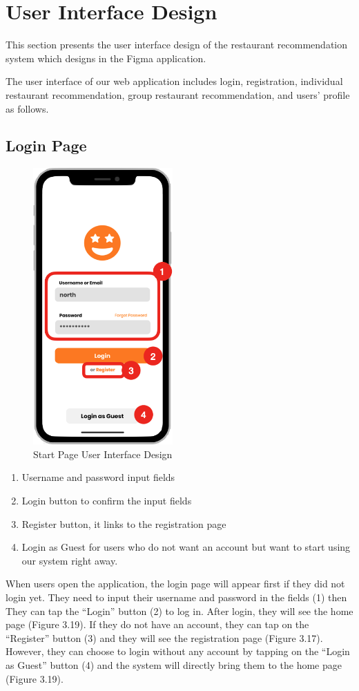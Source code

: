 \documentclass[12pt,oneside,openright,a4paper]{cpe-english-project}
\begin{document}
\section{User Interface Design}
This section presents the user interface design of the restaurant recommendation system which designs in the Figma application.

The user interface of our web application includes login, registration, individual restaurant recommendation, group restaurant recommendation, and users’ profile as follows.

\newpage
\subsection{Login Page}
\begin{figure}[H]\centering
\includegraphics[height=300pt]{./images/3ui_StartPageUserInterfaceDesign.png}
\caption{Start Page User Interface Design}\label{fig:3ui_StartPageUserInterfaceDesign}
\end{figure}
\begin{enumerate}
\item Username and password input fields
\item Login button to confirm the input fields
\item Register button, it links to the registration page
\item Login as Guest for users who do not want an account but want to start using our system right away.
\end{enumerate}
When users open the application, the login page will appear first if they did not login yet. They need to input their username and password in the fields (1) then They can tap the “Login” button (2) to log in. After login, they will see the home page (Figure 3.19). If they do not have an account, they can tap on the “Register” button (3) and they will see the registration page (Figure 3.17). However, they can choose to login without any account by tapping on the “Login as Guest” button (4) and the system will directly bring them to the home page (Figure 3.19).
\newpage
\end{document}
